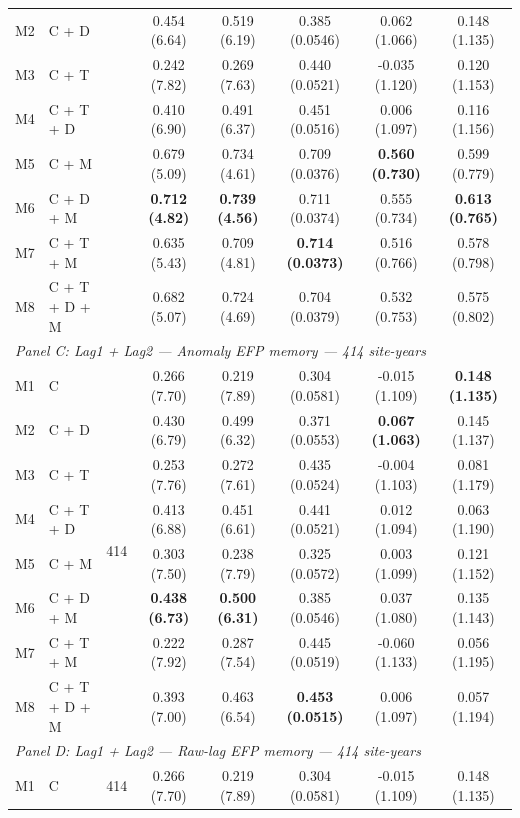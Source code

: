 \begin{table}[htbp]
\begin{tabular}{llcccccc}
M2 & C + D &  & 0.454 (6.64) & 0.519 (6.19) & 0.385 (0.0546) & 0.062 (1.066) & 0.148 (1.135) \\
M3 & C + T &  & 0.242 (7.82) & 0.269 (7.63) & 0.440 (0.0521) & -0.035 (1.120) & 0.120 (1.153) \\
M4 & C + T + D &  & 0.410 (6.90) & 0.491 (6.37) & 0.451 (0.0516) & 0.006 (1.097) & 0.116 (1.156) \\
M5 & C + M &  & 0.679 (5.09) & 0.734 (4.61) & 0.709 (0.0376) & \textbf{0.560 (0.730)} & 0.599 (0.779) \\
M6 & C + D + M &  & \textbf{0.712 (4.82)} & \textbf{0.739 (4.56)} & 0.711 (0.0374) & 0.555 (0.734) & \textbf{0.613 (0.765)} \\
M7 & C + T + M &  & 0.635 (5.43) & 0.709 (4.81) & \textbf{0.714 (0.0373)} & 0.516 (0.766) & 0.578 (0.798) \\
M8 & C + T + D + M &  & 0.682 (5.07) & 0.724 (4.69) & 0.704 (0.0379) & 0.532 (0.753) & 0.575 (0.802) \\
\midrule
\multicolumn{8}{l}{\textit{Panel C: Lag1 + Lag2 --- Anomaly EFP memory --- 414 site-years}} \\
\midrule
M1 & C & \multirow{8}{*}{414} & 0.266 (7.70) & 0.219 (7.89) & 0.304 (0.0581) & -0.015 (1.109) & \textbf{0.148 (1.135)} \\
M2 & C + D &  & 0.430 (6.79) & 0.499 (6.32) & 0.371 (0.0553) & \textbf{0.067 (1.063)} & 0.145 (1.137) \\
M3 & C + T &  & 0.253 (7.76) & 0.272 (7.61) & 0.435 (0.0524) & -0.004 (1.103) & 0.081 (1.179) \\
M4 & C + T + D &  & 0.413 (6.88) & 0.451 (6.61) & 0.441 (0.0521) & 0.012 (1.094) & 0.063 (1.190) \\
M5 & C + M &  & 0.303 (7.50) & 0.238 (7.79) & 0.325 (0.0572) & 0.003 (1.099) & 0.121 (1.152) \\
M6 & C + D + M &  & \textbf{0.438 (6.73)} & \textbf{0.500 (6.31)} & 0.385 (0.0546) & 0.037 (1.080) & 0.135 (1.143) \\
M7 & C + T + M &  & 0.222 (7.92) & 0.287 (7.54) & 0.445 (0.0519) & -0.060 (1.133) & 0.056 (1.195) \\
M8 & C + T + D + M &  & 0.393 (7.00) & 0.463 (6.54) & \textbf{0.453 (0.0515)} & 0.006 (1.097) & 0.057 (1.194) \\
\midrule
\multicolumn{8}{l}{\textit{Panel D: Lag1 + Lag2 --- Raw-lag EFP memory --- 414 site-years}} \\
\midrule
M1 & C & \multirow{8}{*}{414} & 0.266 (7.70) & 0.219 (7.89) & 0.304 (0.0581) & -0.015 (1.109) & 0.148 (1.135) \\

\end{tabular}
\end{table}
